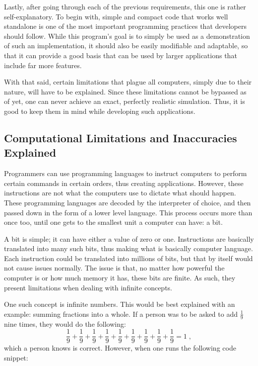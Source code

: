 Lastly, after going through each of the previous requirements, this one is rather self-explanatory. To begin with, simple and compact code that works well standalone is one of the most important programming practices that developers should follow. While this program's goal is to simply be used as a demonstration of such an implementation, it should also be easily modifiable and adaptable, so that it can provide a good basis that can be used by larger applications that include far more features.

With that said, certain limitations that plague all computers, simply due to their nature, will have to be explained. Since these limitations cannot be bypassed as of yet, one can never achieve an exact, perfectly realistic simulation. Thus, it is good to keep them in mind while developing such applications.

\subsection{Computational Limitations and Inaccuracies Explained}

Programmers can use programming languages to instruct computers to perform certain commands in certain orders, thus creating applications. However, these instructions are not what the computers use to dictate what should happen. These programming languages are decoded by the interpreter of choice, and then passed down in the form of a lower level language. This process occurs more than once too, until one gets to the smallest unit a computer can have: a bit.

A bit is simple; it can have either a value of zero or one. Instructions are basically translated into many such bits, thus making what is basically computer language. Each instruction could be translated into millions of bits, but that by itself would not cause issues normally. The issue is that, no matter how powerful the computer is or how much memory it has, these bits are finite. As such, they present limitations when dealing with infinite concepts.

One such concept is infinite numbers. This would be best explained with an example: summing fractions into a whole. If a person was to be asked to add $\frac{1}{9}$ nine times, they would do the following:
$$\frac{1}{9} + \frac{1}{9} + \frac{1}{9} + \frac{1}{9} + \frac{1}{9} + \frac{1}{9} + \frac{1}{9} + \frac{1}{9} + \frac{1}{9} = 1 \;,$$ which a person knows is correct. However, when one runs the following code snippet:

